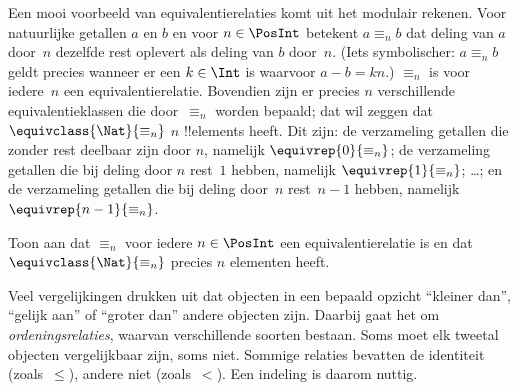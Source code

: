 \documentclass[openany]{memoir}
\begin{document}
\begin{ex}
Een mooi voorbeeld van equivalentierelaties komt uit het modulair rekenen.
Voor natuurlijke getallen $a$ en $b$ en voor $n \in \PosInt$ betekent
$a \equiv_n b$ dat
deling van $a$ door~$n$ dezelfde rest oplevert als deling van $b$ door~$n$.
(Iets symbolischer: $a \equiv_n b$ geldt precies wanneer er een $k \in
\Int$ is waarvoor $a - b = kn$.) $\equiv_n$ is voor iedere~$n$ een
equivalentierelatie. Bovendien zijn er precies $n$ verschillende
equivalentieklassen die door~$\equiv_n$ worden bepaald; dat wil zeggen
dat $\equivclass{\Nat}{\equiv_n}$
$n$ !!{element}s heeft. Dit zijn: de verzameling getallen die zonder rest
deelbaar zijn door $n$, namelijk $\equivrep{0}{\equiv_n}$; de verzameling
getallen die bij deling door $n$ rest~$1$ hebben, namelijk
$\equivrep{1}{\equiv_n}$; \ldots; en de verzameling getallen die bij deling
door~$n$ rest~$n-1$ hebben, namelijk~$\equivrep{n-1}{\equiv_n}$.
\end{ex}

\begin{prob}
Toon aan dat $\equiv_n$ voor iedere $n \in \PosInt$ een equivalentierelatie
is en dat $\equivclass{\Nat}{\equiv_n}$ precies $n$ elementen heeft.
\end{prob}
\endgroup

\begingroup
\def\olfilename{OLP-0016}
\def\olfilepath{content/sets-functions-relations/relations/}
\hypertarget{unit-OLP-0016}{}




\begin{explain}
Veel vergelijkingen drukken uit dat objecten in een bepaald opzicht
``kleiner dan'', ``gelijk aan'' of ``groter dan'' andere objecten zijn. Daarbij
gaat het om \emph{ordeningsrelaties}, waarvan verschillende soorten bestaan.
Soms moet elk tweetal objecten vergelijkbaar zijn, soms niet. Sommige relaties
bevatten de identiteit (zoals~$\le$), andere niet (zoals~$<$). Een indeling is
daarom nuttig.
\end{explain}
\end{document}
